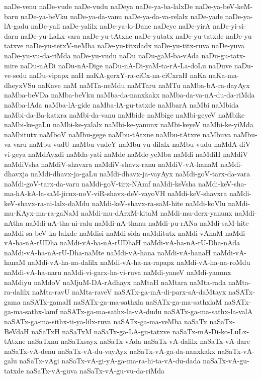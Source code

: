 {naDe-venu
naDe-vude
naDe-vudu
naDeya
naDe-ya-ba-lalxDe
naDe-ya-beV-keM-baru
naDe-ya-beVku
naDe-ya-da-vanu
naDe-ya-da-va-relalx
naDe-yade
naDe-ya-lA-gadu
naDe-yali
naDe-yalilx
naDe-ya-lo-Dane
naDeye
naDe-yirA
naDe-yi-si-daru
naDe-yu-LaLx-vara
naDe-yu-tAtxne
naDe-yutatx
naDe-yu-tatxde
naDe-yu-tatxve
naDe-yu-tetxV-neMba
naDe-yu-titxdadx
naDe-yu-titx-ruva
naDe-yuva
naDe-yu-vu-da-riMda
naDe-yu-vudu
naDu
naDu-gaM-ba-vAda
naDu-gu-tatx-mire
naDu-nADi
naDu-nA-Dige
naDu-nA-Di-yaM-ta-rA-La-doLu
naDuve
naDu-ve-sedu
naDu-vipapx
naH
naKA-gerxY-ra-ciCx-na-ciCxraH
naKa
naKa-ma-dheyxVSu
naKave
naM
naMTa-neMdu
naMTaru
naMTu
naMba-bA-ra-dayAyx
naMba-beVDa
naMba-beVku
naMba-da-nanxkakx
naMba-da-va-nA-du-da-riMda
naMba-lAda
naMba-lA-gide
naMba-lA-gu-tatxde
naMbarA
naMbi
naMbida
naMbi-da-Ba-katxra
naMbi-da-vanu
naMbide
naMbige
naMbi-geyeV
naMbike
naMbi-ke-gaLu
naMbi-ke-yalalx
naMbi-ke-yanunx
naMbi-keyeV
naMbi-ke-yiMda
naMbitutx
naMboV
naMbu-gege
naMbu-tAtxne
naMbu-tAtxre
naMbuva
naMbu-va-varu
naMbu-vudU
naMbu-vudeY
naMbu-vu-dilalx
naMbu-vudu
naMdA-diV-vi-geya
naMdAyxdi
naMda-yati
naMde
naMde-yeMba
naMdi
naMdiH
naMdiV
naMdiVsha
naMdiV-shavxra
naMdiV-shavx-ranu
naMdiV-vA-hanaM
naMdi-dhavxja
naMdi-dhavx-ja-gaLu
naMdi-dhavx-ja-vayAyx
naMdi-goV-tarx-da-vara
naMdi-goV-tarx-da-varu
naMdi-goV-tirx-NAmf
naMdi-keVsha
naMdi-keV-sha-ma-hA-kA-la-saM-jicnx-noV-viR-shavx-deV-vayoVH
naMdi-keV-shavxra
naMdi-keV-shavx-ra-ni-lalx-daMdu
naMdi-keV-shavx-ra-saM-hite
naMdi-koVlu
naMdi-mu-KAyx-ma-ra-gaNaM
naMdi-mu-dArxM-kitaM
naMdi-mu-derx-yanunx
naMdi-nAtha
naMdi-nA-tha-ni-ralu
naMdi-nA-thanu
naMdi-pu-rANa
naMdi-saM-hite
naMdi-sa-beV-ka-lalxde
naMdisi
naMdi-sida
naMditutx
naMdi-vAhaM
naMdi-vA-ha-nA-rUDha
naMdi-vA-ha-nA-rUDhaH
naMdi-vA-ha-nA-rU-Dha-nAda
naMdi-vA-ha-nA-rU-Dha-naMte
naMdi-vA-hana
naMdi-vA-hanaH
naMdi-vA-hanaM
naMdi-vA-ha-na-dalilx
naMdi-vA-ha-na-rapapx
naMdi-vA-ha-na-roMdu
naMdi-vA-ha-naru
naMdi-vi-garx-ha-vi-ruva
naMdi-yaneV
naMdi-yanunx
naMdiyu
naMdoV
naMjuM-DA-rAdhayx
naMtaH
naMtara
naMta-rada
naMta-ra-dalilx
naMta-ravU
naMta-raveV
naSATx-ga-mA-di-parx-sA-daMtayx
naSATx-gama
naSATx-gamaH
naSATx-ga-ma-sathxla
naSATx-ga-ma-sathxlaM
naSATx-ga-ma-sathx-lamf
naSATx-ga-ma-sathx-la-vA-dudu
naSATx-ga-ma-sathx-la-valA
naSATx-ga-ma-sithx-ti-ya-lilx-ruva
naSATx-ga-ma-veMba
naSaTx
naSaTx-BeVdaH
naSaTxH
naSaTxM
naSaTx-ga-LA-gu-tatxve
naSaTx-mA-Di-ko-LuLx-tAtxne
naSaTxnu
naSaTxsayx
naSaTx-vAda
naSaTx-vA-dalilx
naSaTx-vA-dare
naSaTx-vA-denu
naSaTx-vA-du-vayAyx
naSaTx-vA-ga-da-nanxkakx
naSaTx-vA-galu
naSaTx-vAgi
naSaTx-vA-gi-yA-ga-ma-ra-hi-ta-vA-du-dada
naSaTx-vA-gu-tatxde
naSaTx-vA-guva
naSaTx-vA-gu-vu-da-riMda
}
